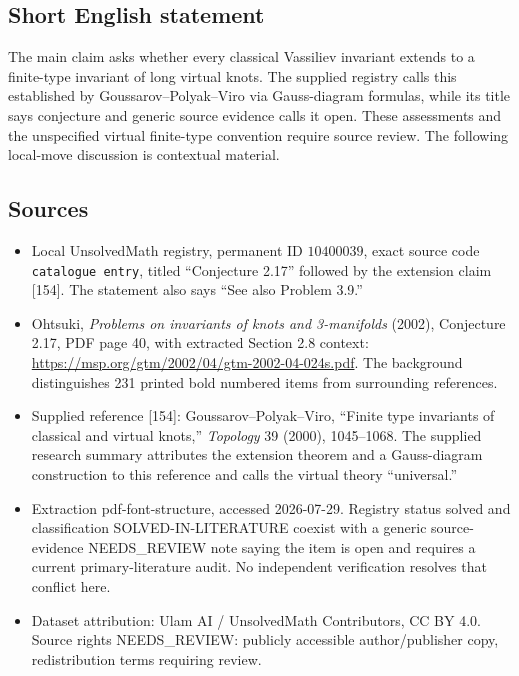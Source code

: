 \documentclass[11pt]{article}
\begin{document}
\subsection{Short English statement}
The main claim asks whether every classical Vassiliev invariant extends to a finite-type invariant of long virtual knots. The supplied registry calls this established by Goussarov--Polyak--Viro via Gauss-diagram formulas, while its title says conjecture and generic source evidence calls it open. These assessments and the unspecified virtual finite-type convention require source review. The following local-move discussion is contextual material.
\subsection{Sources}
\begin{itemize}
\item Local UnsolvedMath registry, permanent ID \(10400039\), exact source code \texttt{catalogue entry}, titled ``Conjecture 2.17'' followed by the extension claim [154]. The statement also says ``See also Problem 3.9.''
\item Ohtsuki, \emph{Problems on invariants of knots and 3-manifolds} (2002), Conjecture 2.17, PDF page 40, with extracted Section 2.8 context: \url{https://msp.org/gtm/2002/04/gtm-2002-04-024s.pdf}. The background distinguishes 231 printed bold numbered items from surrounding references.
\item Supplied reference [154]: Goussarov--Polyak--Viro, ``Finite type invariants of classical and virtual knots,'' \emph{Topology} 39 (2000), 1045--1068. The supplied research summary attributes the extension theorem and a Gauss-diagram construction to this reference and calls the virtual theory ``universal.''
\item Extraction pdf-font-structure, accessed 2026-07-29. Registry status solved and classification SOLVED-IN-LITERATURE coexist with a generic source-evidence NEEDS\_REVIEW note saying the item is open and requires a current primary-literature audit. No independent verification resolves that conflict here.
\item Dataset attribution: Ulam AI / UnsolvedMath Contributors, CC BY 4.0. Source rights NEEDS\_REVIEW: publicly accessible author/publisher copy, redistribution terms requiring review.
\end{itemize}
\end{document}
